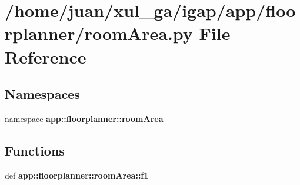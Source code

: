 \section{/home/juan/xul\_\-ga/igap/app/floorplanner/roomArea.py File Reference}
\label{roomArea_8py}
\subsection*{Namespaces}
\begin{CompactItemize}
\item 
namespace {\bf app::floorplanner::roomArea}
\end{CompactItemize}
\subsection*{Functions}
\begin{CompactItemize}
\item 
def {\bf app::floorplanner::roomArea::f1}
\end{CompactItemize}
